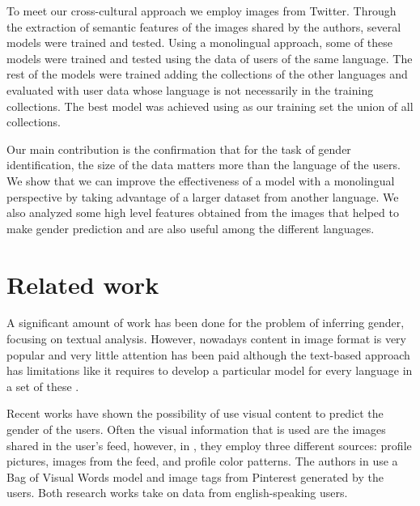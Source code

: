 \documentclass[runningheads]{llncs}
\begin{document}
To meet our cross-cultural approach
we employ images from Twitter. Through the extraction of semantic features of 
the images shared by the authors, several models
were trained and tested. Using a monolingual approach, some of these models
were trained and tested using the data of users
of the same language. The rest of the models 
were trained adding the collections of the 
other languages and evaluated with user data 
whose language is not necessarily in the 
training collections. The best model was achieved using as our training set the union of all collections. 

Our main contribution is the confirmation
that for the task of gender identification, 
the size of the data matters more than the
language of the users. We show that we can improve the effectiveness of a model with a monolingual perspective by taking advantage of a larger dataset from another language. We also analyzed some high level features obtained from the images that helped to make gender prediction and are also useful among the different languages.

\section{Related work}

A significant amount of work has been done for the problem of inferring gender, focusing on
textual analysis. However, nowadays content in image format is very popular and 
very little attention has been paid although the text-based approach has limitations like it requires to develop a particular model for every language in a set of these \cite{ciot2013gender}.

Recent works have shown the possibility of use visual content
to predict the gender of the users. 
Often the visual information that is used are the images shared in the user's feed, 
however, in \cite{merler2015you}, they employ three different sources: profile pictures, images from the feed,
and profile color patterns.
The authors in \cite{you2016picture} use a Bag of Visual Words model
and image tags from Pinterest generated by the users. Both research works
take on data from english-speaking users.
\end{document}
